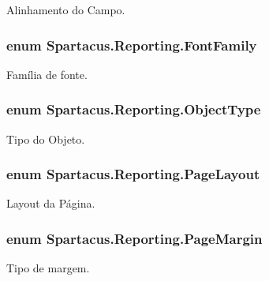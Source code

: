 Alinhamento do Campo. 

\hypertarget{namespaceSpartacus_1_1Reporting_a9108ed8004cb83935ed4785cc790fddf}{
\subsubsection[{Font\+Family}]{\setlength{\rightskip}{0pt plus 5cm}enum {\bf Spartacus.\+Reporting.\+Font\+Family}}}\label{namespaceSpartacus_1_1Reporting_a9108ed8004cb83935ed4785cc790fddf}


Família de fonte. 

\hypertarget{namespaceSpartacus_1_1Reporting_a3727122f6fe78a79014ed0180e0ac2e3}{
\subsubsection[{Object\+Type}]{\setlength{\rightskip}{0pt plus 5cm}enum {\bf Spartacus.\+Reporting.\+Object\+Type}}}\label{namespaceSpartacus_1_1Reporting_a3727122f6fe78a79014ed0180e0ac2e3}


Tipo do Objeto. 

\hypertarget{namespaceSpartacus_1_1Reporting_a5e056b0c6896c4426cb938d08c5acb34}{
\subsubsection[{Page\+Layout}]{\setlength{\rightskip}{0pt plus 5cm}enum {\bf Spartacus.\+Reporting.\+Page\+Layout}}}\label{namespaceSpartacus_1_1Reporting_a5e056b0c6896c4426cb938d08c5acb34}


Layout da Página. 

\hypertarget{namespaceSpartacus_1_1Reporting_ab924f4d0d38ee1ef2a116121e4ec44fa}{
\subsubsection[{Page\+Margin}]{\setlength{\rightskip}{0pt plus 5cm}enum {\bf Spartacus.\+Reporting.\+Page\+Margin}}}\label{namespaceSpartacus_1_1Reporting_ab924f4d0d38ee1ef2a116121e4ec44fa}


Tipo de margem. 

